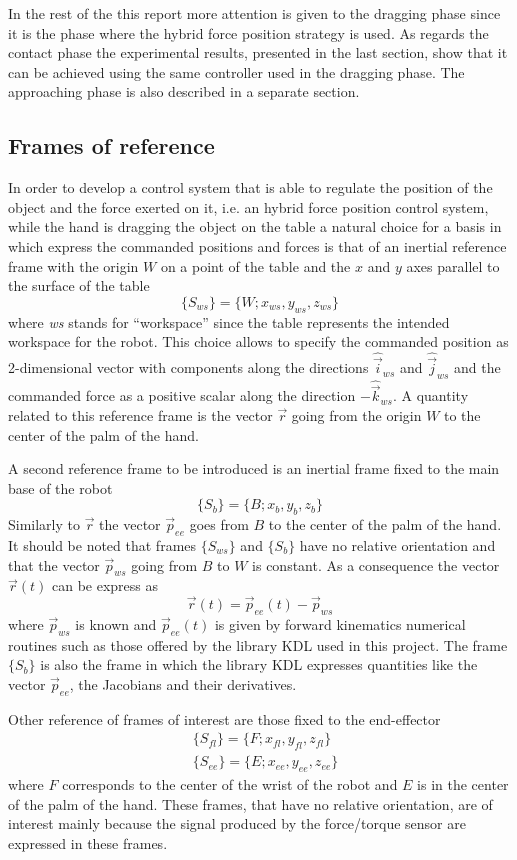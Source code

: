 In the rest of the this report more attention is given to the dragging phase since it is the phase
where the hybrid force position strategy is used. As regards the contact phase the experimental results,
presented in the last section, show that it can be achieved using the same controller used in the dragging
phase. The approaching phase is also described in a separate section.

\subsection{Frames of reference}\label{sec:frames}
In order to develop a control system that is able to regulate the position of the object
and the force exerted on it, i.e. an hybrid force position control system, while the hand
is dragging the object on the table
a natural choice for a basis in which express the commanded positions and forces is that of
an inertial reference frame with the origin $W$ on a point of the table and the $x$ and $y$ axes parallel to the surface
of the table
\[
\{S_{ws}\} = \{W; x_{ws}, y_{ws}, z_{ws} \}
\]
where \emph{ws} stands for ``workspace'' since the table represents the intended workspace
for the robot. This choice allows to specify the commanded position as 2-dimensional vector
with components along the directions $\hat{\vec{i}}_{ws}$ and $\hat{\vec{j}}_{ws}$ and the
commanded force as a positive scalar along the direction $-\hat{\vec{k}}_{ws}$.
A quantity related to this reference frame is the vector $\vec{r}$ going from the origin $W$
to the center of the palm of the hand.
\par
A second reference frame to be introduced is an inertial frame fixed to the main base of the robot
\[
\{S_b\} = \{B; x_b, y_b, z_b \}
\]
Similarly to $\vec{r}$ the vector $\vec{p}_{ee}$ goes from $B$ to the center of the palm of the hand.
It should be noted that frames $\{S_{ws}\}$ and $\{S_b\}$ have no relative orientation and that
the vector $\vec{p}_{ws}$ going from $B$ to $W$ is constant. As a consequence the vector $\vec{r}(t)$
can be express as
\[
\vec{r}(t) = \vec{p}_{ee}(t) - \vec{p}_{ws}
\]
where $\vec{p}_{ws}$ is known and $\vec{p}_{ee}(t)$ is given by forward kinematics
numerical routines such as those offered by the library KDL used in this project.
The frame $\{S_b\}$ is also the frame in which the library KDL expresses quantities
like the vector $\vec{p}_{ee}$, the Jacobians and their derivatives.
\par
Other reference of frames of interest are those fixed to the end-effector
\[
\begin{split}
  &\{S_{fl}\} = \{F; x_{fl}, y_{fl}, z_{fl} \}\\
  &\{S_{ee}\} = \{E; x_{ee}, y_{ee}, z_{ee} \}
\end{split}
\]
where $F$ corresponds to the center of the wrist of the robot and $E$ is in the center
of the palm of the hand. These frames, that have no relative orientation,  are of interest
mainly because the signal produced by the force/torque sensor are expressed in these frames.

